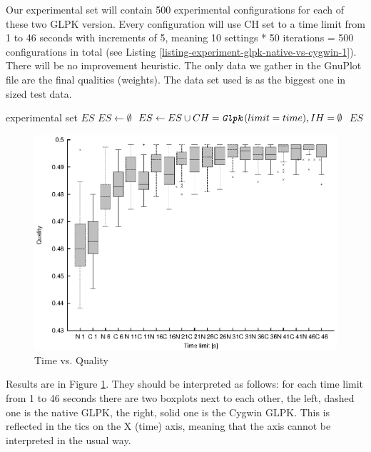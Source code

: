 Our experimental set will contain 500 experimental configurations for each of these two GLPK version. Every configuration will use  CH set to a time limit from 1 to 46 seconds with increments of 5, meaning 10 settings * 50 iterations = 500 configurations in total (see Listing \ref{listing-experiment-glpk-native-vs-cygwin-1}). There will be no improvement heuristic. The only data we gather in the GnuPlot file are the final qualities (weights). The data set used is  as the biggest one in sized test data.\\

\begin{algorithm}
\caption{GLPK: Native vs. Cygwin Set Generation 1}
\label{listing-experiment-glpk-native-vs-cygwin-1}
\begin{algorithmic}
\ENSURE experimental set $ES$
\STATE $ES \gets \emptyset$
    \STATE $ES \gets ES \cup {CH = \texttt{\textit{Glpk}}(limit = time), IH = \emptyset}$
  \ENDFOR
\ENDFOR
\RETURN $ES$
\end{algorithmic}
\end{algorithm}

\begin{figure}
  \caption{Time vs. Quality}
  \label{image-experiment-time-vs-quality}
  \centering
    \includegraphics[width=\textwidth]{images/experiments/time-vs-quality}
\end{figure}

Results are in Figure \ref{image-experiment-time-vs-quality}. They should be interpreted as follows: for each time limit from 1 to 46 seconds there are two boxplots next to each other, the left, dashed one is the native GLPK, the right, solid one is the Cygwin GLPK. This is reflected in the tics on the X (time) axis, meaning that the axis cannot be interpreted in the usual way.

